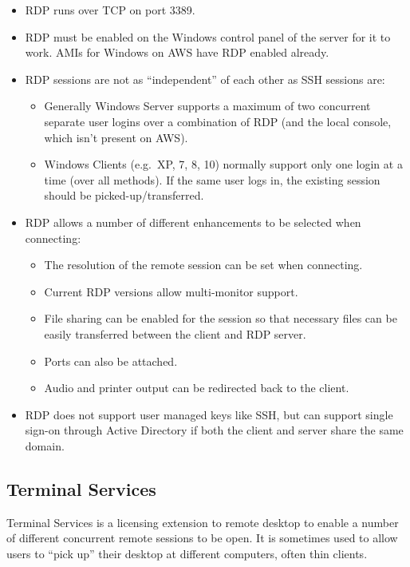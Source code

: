 \documentclass{pgnotes}
\begin{document}
\begin{itemize}
\item
  RDP runs over TCP on port 3389.
\item
  RDP must be enabled on the Windows control panel of the server for it
  to work. AMIs for Windows on AWS have RDP enabled already.
\item
  RDP sessions are not as ``independent'' of each other as SSH sessions
  are:

  \begin{itemize}
  \item
    Generally Windows Server supports a maximum of two concurrent
    separate user logins over a combination of RDP (and the local
    console, which isn't present on AWS).
  \item
    Windows Clients (e.g.~XP, 7, 8, 10) normally support only one login
    at a time (over all methods). If the same user logs in, the existing
    session should be picked-up/transferred.
  \end{itemize}
\item
  RDP allows a number of different enhancements to be selected when
  connecting:

  \begin{itemize}
  \item
    The resolution of the remote session can be set when connecting.
  \item
    Current RDP versions allow multi-monitor support.
  \item
    File sharing can be enabled for the session so that necessary files
    can be easily transferred between the client and RDP server.
  \item
    Ports can also be attached.
  \item
    Audio and printer output can be redirected back to the client.
  \end{itemize}
\item
  RDP does not support user managed keys like SSH, but can support
  single sign-on through Active Directory if both the client and server
  share the same domain.
\end{itemize}

\subsection{Terminal Services}\label{terminal-services}

Terminal Services is a licensing extension to remote desktop to enable a
number of different concurrent remote sessions to be open. It is
sometimes used to allow users to ``pick up'' their desktop at different
computers, often thin clients.
\end{document}
